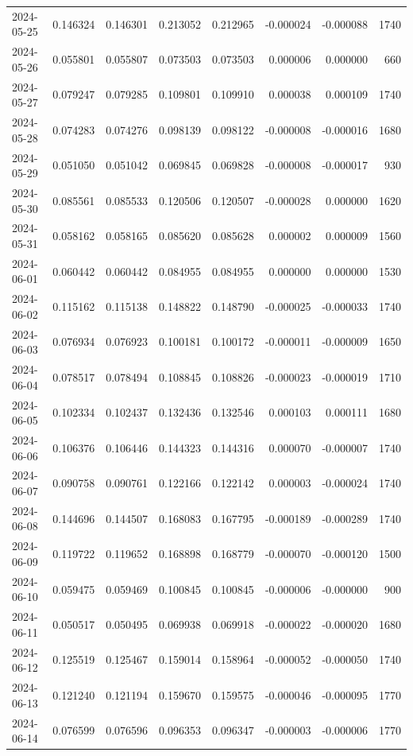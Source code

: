 \begin{tabular}{lrrrrrrr}
2024-05-25 & 0.146324 & 0.146301 & 0.213052 & 0.212965 & -0.000024 & -0.000088 & 1740 \\
2024-05-26 & 0.055801 & 0.055807 & 0.073503 & 0.073503 & 0.000006 & 0.000000 & 660 \\
2024-05-27 & 0.079247 & 0.079285 & 0.109801 & 0.109910 & 0.000038 & 0.000109 & 1740 \\
2024-05-28 & 0.074283 & 0.074276 & 0.098139 & 0.098122 & -0.000008 & -0.000016 & 1680 \\
2024-05-29 & 0.051050 & 0.051042 & 0.069845 & 0.069828 & -0.000008 & -0.000017 & 930 \\
2024-05-30 & 0.085561 & 0.085533 & 0.120506 & 0.120507 & -0.000028 & 0.000000 & 1620 \\
2024-05-31 & 0.058162 & 0.058165 & 0.085620 & 0.085628 & 0.000002 & 0.000009 & 1560 \\
2024-06-01 & 0.060442 & 0.060442 & 0.084955 & 0.084955 & 0.000000 & 0.000000 & 1530 \\
2024-06-02 & 0.115162 & 0.115138 & 0.148822 & 0.148790 & -0.000025 & -0.000033 & 1740 \\
2024-06-03 & 0.076934 & 0.076923 & 0.100181 & 0.100172 & -0.000011 & -0.000009 & 1650 \\
2024-06-04 & 0.078517 & 0.078494 & 0.108845 & 0.108826 & -0.000023 & -0.000019 & 1710 \\
2024-06-05 & 0.102334 & 0.102437 & 0.132436 & 0.132546 & 0.000103 & 0.000111 & 1680 \\
2024-06-06 & 0.106376 & 0.106446 & 0.144323 & 0.144316 & 0.000070 & -0.000007 & 1740 \\
2024-06-07 & 0.090758 & 0.090761 & 0.122166 & 0.122142 & 0.000003 & -0.000024 & 1740 \\
2024-06-08 & 0.144696 & 0.144507 & 0.168083 & 0.167795 & -0.000189 & -0.000289 & 1740 \\
2024-06-09 & 0.119722 & 0.119652 & 0.168898 & 0.168779 & -0.000070 & -0.000120 & 1500 \\
2024-06-10 & 0.059475 & 0.059469 & 0.100845 & 0.100845 & -0.000006 & -0.000000 & 900 \\
2024-06-11 & 0.050517 & 0.050495 & 0.069938 & 0.069918 & -0.000022 & -0.000020 & 1680 \\
2024-06-12 & 0.125519 & 0.125467 & 0.159014 & 0.158964 & -0.000052 & -0.000050 & 1740 \\
2024-06-13 & 0.121240 & 0.121194 & 0.159670 & 0.159575 & -0.000046 & -0.000095 & 1770 \\
2024-06-14 & 0.076599 & 0.076596 & 0.096353 & 0.096347 & -0.000003 & -0.000006 & 1770 \\

\end{tabular}
